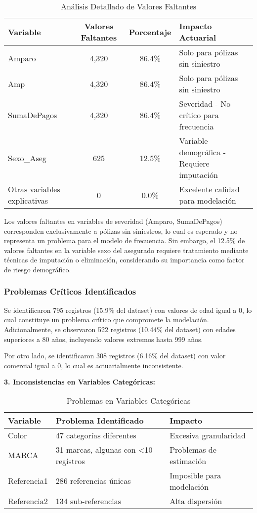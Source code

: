 \begin{table}[H]
\centering
\caption{Análisis Detallado de Valores Faltantes}
\begin{tabular}{|l|c|c|l|}
\hline
\textbf{Variable} & \textbf{Valores Faltantes} & \textbf{Porcentaje} & \textbf{Impacto Actuarial} \\
\hline
Amparo & 4,320 & 86.4\% & Solo para pólizas sin siniestro \\
Amp & 4,320 & 86.4\% & Solo para pólizas sin siniestro \\
SumaDePagos & 4,320 & 86.4\% & Severidad - No crítico para frecuencia \\
Sexo\_Aseg & 625 & 12.5\% & Variable demográfica - Requiere imputación \\
Otras variables explicativas & 0 & 0.0\% & Excelente calidad para modelación \\
\hline
\end{tabular}
\end{table}

Los valores faltantes en variables de severidad (Amparo, SumaDePagos) corresponden exclusivamente a pólizas sin siniestros, lo cual es esperado y no representa un problema para el modelo de frecuencia. Sin embargo, el 12.5\% de valores faltantes en la variable sexo del asegurado requiere tratamiento mediante técnicas de imputación o eliminación, considerando su importancia como factor de riesgo demográfico.

\subsubsection{Problemas Críticos Identificados}

Se identificaron 795 registros (15.9\% del dataset) con valores de edad igual a 0, lo cual constituye un problema crítico que compromete la modelación.
Adicionalmente, se observaron 522 registros (10.44\% del dataset) con edades superiores a 80 años, incluyendo valores extremos hasta 999 años.
\newline

Por otro lado, se identificaron 308 registros (6.16\% del dataset) con valor comercial igual a 0, lo cual es actuarialmente inconsistente.
\newline

\textbf{3. Inconsistencias en Variables Categóricas:}

\begin{table}[H]
\centering
\caption{Problemas en Variables Categóricas}
\begin{tabular}{|l|l|l|}
\hline
\textbf{Variable} & \textbf{Problema Identificado} & \textbf{Impacto} \\
\hline
Color & 47 categorías diferentes & Excesiva granularidad \\
MARCA & 31 marcas, algunas con <10 registros & Problemas de estimación \\
Referencia1 & 286 referencias únicas & Imposible para modelación \\
Referencia2 & 134 sub-referencias & Alta dispersión \\
\hline
\end{tabular}
\end{table}

